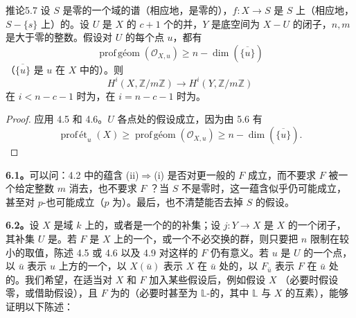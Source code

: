 \begin{SGAresult}{推论}{5.7}
设 $S$ 是零的一个域的谱（相应地，是零的），$f:X\to S$ 是 $S$ 上（相应地，$S-\{s\}$ 上）的。设 $U$ 是 $X$ 的 $c+1$ 个的并，$Y$ 是底空间为 $X-U$ 的闭子，$n,m$ 是大于零的整数。假设对 $U$ 的每个点 $u$，都有
\[
\operatorname{prof\,\text{géom}}(\mathscr O_{X,u})\geq n-\dim(\overline{\{u\}})
\]
（$\overline{\{u\}}$ 是 $u$ 在 $X$ 中的）。则
\[
H^i(X,\mathbb Z/m\mathbb Z)\longrightarrow H^i(Y,\mathbb Z/m\mathbb Z)
\]
在 $i<n-c-1$ 时为，在 $i=n-c-1$ 时为。
\end{SGAresult}
\begin{proof}
应用 4.5 和 4.6。$U$ 各点处的假设成立，因为由 5.6 有
\[
\operatorname{prof\,\text{ét}}_u(X)\geq\operatorname{prof\,\text{géom}}(\mathscr O_{X,u})
\geq n-\dim(\overline{\{u\}}).
\]
\end{proof}

\textbf{6.1。}可以问：4.2 中的蕴含 (ii)$\Rightarrow$(i) 是否对更一般的 $F$ 成立，而不要求 $F$ 被一个给定整数 $m$ 消去，也不要求 $F$ ？当 $S$ 不是零时，这一蕴含似乎仍可能成立，甚至对 $p$-也可能成立（$p$ 为）。最后，也不清楚能否去掉 $S$ 的假设。

\textbf{6.2。}设 $X$ 是域 $k$ 上的，或者是一个的的补集；设 $j:Y\to X$ 是 $X$ 的一个闭子，其补集 $U$ 是。若 $F$ 是 $X$ 上的一个，或一个不必交换的群，则只要把 $n$ 限制在较小的取值，陈述 4.5 或 4.6 以及 4.9 对这样的 $F$ 仍有意义。若 $u$ 是 $U$ 的一个点，以 $\bar u$ 表示 $u$ 上方的一个，以 $X(\bar u)$ 表示 $X$ 在 $\bar u$ 处的，以 $F_{\bar u}$ 表示 $F$ 在 $\bar u$ 处的。我们希望，在适当对 $X$ 和 $F$ 加入某些假设后，例如假设 $X$ （必要时假设零，或借助假设），且 $F$ 为的（必要时甚至为 $\mathbb L$-的，其中 $\mathbb L$ 与 $X$ 的互素），能够证明以下陈述：

